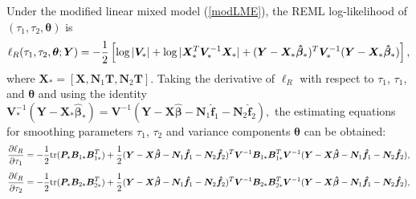 \documentclass[review]{elsarticle}
\begin{document}
Under the  modified linear mixed model (\ref{modLME}), the REML log-likelihood of $(\tau_1, \tau_2, \boldsymbol \theta)$ is 
$$
\ell_R(\tau_1, \tau_2, \bm \theta; \bm Y) 
 =
 -{1\over 2}  
\left[
 \log |\bm  V_*|  +  \log |\bm X_*^T \bm V_*^{-1} \bm X_*| 
 +  (\bm Y - \bm X_* \bm {\hat \beta}_*)^T 
 \bm V_* ^{-1}  
 (\bm Y - \bm X_* \bm {\hat \beta}_*) 
\right],
$$
where 
$\bm X_* = [\bm X, \bm N_1 \bm T, \bm N_2 \bm T]$. 
Taking the derivative of $\ell_R$ with respect to $\tau_1$, $\tau_1$, and $\boldsymbol \theta$ and using the identity 
$
\boldsymbol V^{-1}_*
(\boldsymbol Y - \boldsymbol X_* \boldsymbol   {\hat \beta}_*) 
=
\boldsymbol V^{-1} 
(\boldsymbol Y - \boldsymbol X \boldsymbol {\hat\beta} 
- \boldsymbol N_1 \boldsymbol {\hat f}_1
 - \boldsymbol N_2 \boldsymbol {\hat f}_2),
$
the estimating equations for smoothing parameters $\tau_1$, $\tau_2$ 
and variance components $\boldsymbol \theta$  can be obtained:
\begin{equation} \label{score_tau1}
{\partial \ell_R  \over \partial \tau_1}
=
- {1 \over 2}
{\rm tr} (\boldsymbol P_* \boldsymbol B_{1*} \boldsymbol B_{1*}^T) 
+ {1 \over 2} 
(\boldsymbol Y - \boldsymbol X \boldsymbol {\hat\beta} - \boldsymbol N_1 \boldsymbol {\hat f}_1
 - \boldsymbol N_2 \boldsymbol {\hat f}_2)^T
\boldsymbol V^{-1}  
\boldsymbol B_{1*} \boldsymbol B_{1*}^T
\boldsymbol V^{-1}  
(\boldsymbol Y - \boldsymbol X \boldsymbol {\hat\beta} - \boldsymbol N_1 \boldsymbol {\hat f}_1
 - \boldsymbol N_2 \boldsymbol {\hat f}_2),
\end{equation}
\begin{equation} \label{score_tau2}
{\partial \ell_R  \over \partial \tau_2}
=
- {1 \over 2}
{\rm tr} (\boldsymbol P_* \boldsymbol B_{2*} \boldsymbol B_{2*}^T)
+ {1 \over 2} 
(\boldsymbol Y - \boldsymbol X \boldsymbol {\hat\beta} - \boldsymbol N_1 \boldsymbol {\hat f}_1
 - \boldsymbol N_2 \boldsymbol {\hat f}_2)^T
\boldsymbol V^{-1}  
\boldsymbol B_{2*} \boldsymbol B_{2*}^T
\boldsymbol V^{-1}  
(\boldsymbol Y - \boldsymbol X \boldsymbol {\hat\beta} - \boldsymbol N_1 \boldsymbol {\hat f}_1
 - \boldsymbol N_2 \boldsymbol {\hat f}_2),
\end{equation}
\end{document}
